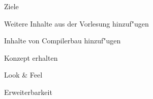 {
\begin{itemgroup}{}
   \item Ziele
   \begin{itemgroup}{}
      \item Weitere Inhalte aus der Vorlesung hinzuf"ugen
      \item Inhalte von Compilerbau hinzuf"ugen
      \item Konzept erhalten
      \begin{itemgroup}{}
         \item Look \& Feel
         \item Erweiterbarkeit
      \end{itemgroup}
   \end{itemgroup}
\end{itemgroup}

\vfill{}
}
